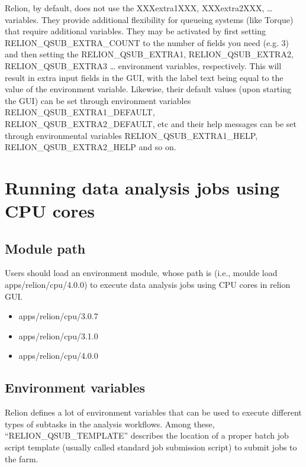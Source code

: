\documentclass[a4paper,10pt,english]{sphinxmanual}
\begin{document}
\sphinxAtStartPar
Relion, by default, does not use the XXXextra1XXX, XXXextra2XXX, … variables.
They provide additional flexibility for queueing systems (like Torque) that require additional variables.
They may be activated by first setting RELION\_QSUB\_EXTRA\_COUNT to the number of fields you need (e.g. 3) and then setting the RELION\_QSUB\_EXTRA1, RELION\_QSUB\_EXTRA2, RELION\_QSUB\_EXTRA3 … environment variables, respectively.
This will result in extra input fields in the GUI, with the label text being equal to the value of the environment variable. Likewise, their default values (upon starting the GUI) can be set through environment variables RELION\_QSUB\_EXTRA1\_DEFAULT, RELION\_QSUB\_EXTRA2\_DEFAULT, etc and their help messages can be set through environmental variables RELION\_QSUB\_EXTRA1\_HELP, RELION\_QSUB\_EXTRA2\_HELP and so on.


\section{Running data analysis jobs using CPU cores}
\label{\detokenize{relion:running-data-analysis-jobs-using-cpu-cores}}

\subsection{Module path}
\label{\detokenize{relion:module-path}}
\sphinxAtStartPar
Users should load an environment module, whose path is   (i.e., moulde load apps/relion/cpu/4.0.0) to execute data analysis jobs using CPU cores in relion GUI.
\begin{itemize}
\item {} 
\sphinxAtStartPar
apps/relion/cpu/3.0.7

\item {} 
\sphinxAtStartPar
apps/relion/cpu/3.1.0

\item {} 
\sphinxAtStartPar
apps/relion/cpu/4.0.0

\end{itemize}


\subsection{Environment variables}
\label{\detokenize{relion:environment-variables}}
\sphinxAtStartPar
Relion defines a lot of environment variables that can be used to execute different types of subtasks in the analysis workflows. Among these, “RELION\_QSUB\_TEMPLATE” describes the location of a proper batch job script template (usually called standard job submission script) to submit jobs to the farm.
\end{document}
